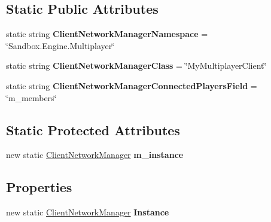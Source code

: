 \subsection*{Static Public Attributes}
\begin{DoxyCompactItemize}
\item 
\hypertarget{class_s_e_mod_a_p_i_internal_1_1_a_p_i_1_1_client_1_1_client_network_manager_a9fbb898679edf9eae01c76ab3f8bc642}{}static string {\bfseries Client\+Network\+Manager\+Namespace} = \char`\"{}Sandbox.\+Engine.\+Multiplayer\char`\"{}\label{class_s_e_mod_a_p_i_internal_1_1_a_p_i_1_1_client_1_1_client_network_manager_a9fbb898679edf9eae01c76ab3f8bc642}

\item 
\hypertarget{class_s_e_mod_a_p_i_internal_1_1_a_p_i_1_1_client_1_1_client_network_manager_a404c2b8bdeeabf1a55d4202945dc3a72}{}static string {\bfseries Client\+Network\+Manager\+Class} = \char`\"{}My\+Multiplayer\+Client\char`\"{}\label{class_s_e_mod_a_p_i_internal_1_1_a_p_i_1_1_client_1_1_client_network_manager_a404c2b8bdeeabf1a55d4202945dc3a72}

\item 
\hypertarget{class_s_e_mod_a_p_i_internal_1_1_a_p_i_1_1_client_1_1_client_network_manager_a2a0685f143e8f8c9075e014b08aceb8f}{}static string {\bfseries Client\+Network\+Manager\+Connected\+Players\+Field} = \char`\"{}m\+\_\+members\char`\"{}\label{class_s_e_mod_a_p_i_internal_1_1_a_p_i_1_1_client_1_1_client_network_manager_a2a0685f143e8f8c9075e014b08aceb8f}

\end{DoxyCompactItemize}
\subsection*{Static Protected Attributes}
\begin{DoxyCompactItemize}
\item 
\hypertarget{class_s_e_mod_a_p_i_internal_1_1_a_p_i_1_1_client_1_1_client_network_manager_a9b9d89dcaaa966e9f3ba7d4b396d4a55}{}new static \hyperlink{class_s_e_mod_a_p_i_internal_1_1_a_p_i_1_1_client_1_1_client_network_manager}{Client\+Network\+Manager} {\bfseries m\+\_\+instance}\label{class_s_e_mod_a_p_i_internal_1_1_a_p_i_1_1_client_1_1_client_network_manager_a9b9d89dcaaa966e9f3ba7d4b396d4a55}

\end{DoxyCompactItemize}
\subsection*{Properties}
\begin{DoxyCompactItemize}
\item 
\hypertarget{class_s_e_mod_a_p_i_internal_1_1_a_p_i_1_1_client_1_1_client_network_manager_a524b5c55d4858e6a8803803e42582129}{}new static \hyperlink{class_s_e_mod_a_p_i_internal_1_1_a_p_i_1_1_client_1_1_client_network_manager}{Client\+Network\+Manager} {\bfseries Instance}\label{class_s_e_mod_a_p_i_internal_1_1_a_p_i_1_1_client_1_1_client_network_manager_a524b5c55d4858e6a8803803e42582129}

\end{DoxyCompactItemize}
